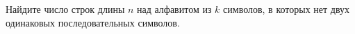 Найдите число строк длины $n$ над алфавитом из $k$ символов, в которых нет двух одинаковых
последовательных символов.